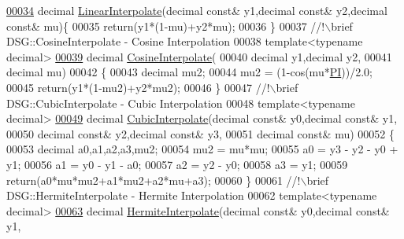 \begin{DoxyCode}
\hypertarget{_interpolate_8h_source_l00034}{}\hyperlink{namespace_d_s_g_af4448472776648fb65623fd29eed262f}{00034}     decimal \hyperlink{namespace_d_s_g_af4448472776648fb65623fd29eed262f}{LinearInterpolate}(decimal \textcolor{keyword}{const}& y1,decimal \textcolor{keyword}{const}& y2,decimal \textcolor{keyword}{const}& mu)\{
00035         \textcolor{keywordflow}{return}(y1*(1-mu)+y2*mu);
00036     \}\textcolor{comment}{}
00037 \textcolor{comment}{    //!\(\backslash\)brief DSG::CosineInterpolate - Cosine Interpolation}
00038 \textcolor{comment}{}    \textcolor{keyword}{template}<\textcolor{keyword}{typename} decimal>
\hypertarget{_interpolate_8h_source_l00039}{}\hyperlink{namespace_d_s_g_a293229b6a440ddf9cc87e9a76d322d43}{00039}     decimal \hyperlink{namespace_d_s_g_a293229b6a440ddf9cc87e9a76d322d43}{CosineInterpolate}(
00040                               decimal y1,decimal y2,
00041                               decimal mu)
00042     \{
00043         decimal mu2;
00044         mu2 = (1-cos(mu*\hyperlink{_p_i_8h_a598a3330b3c21701223ee0ca14316eca}{PI}))/2.0;
00045         \textcolor{keywordflow}{return}(y1*(1-mu2)+y2*mu2);
00046     \}\textcolor{comment}{}
00047 \textcolor{comment}{    //!\(\backslash\)brief DSG::CubicInterpolate - Cubic Interpolation}
00048 \textcolor{comment}{}    \textcolor{keyword}{template}<\textcolor{keyword}{typename} decimal>
\hypertarget{_interpolate_8h_source_l00049}{}\hyperlink{namespace_d_s_g_a7c61e97fb15300de270eb32d51cdc849}{00049}     decimal \hyperlink{namespace_d_s_g_a7c61e97fb15300de270eb32d51cdc849}{CubicInterpolate}(decimal \textcolor{keyword}{const}& y0,decimal \textcolor{keyword}{const}& y1,
00050                              decimal \textcolor{keyword}{const}& y2,decimal \textcolor{keyword}{const}& y3,
00051                              decimal \textcolor{keyword}{const}& mu)
00052     \{
00053         decimal a0,a1,a2,a3,mu2;
00054         mu2 = mu*mu;
00055         a0 = y3 - y2 - y0 + y1;
00056         a1 = y0 - y1 - a0;
00057         a2 = y2 - y0;
00058         a3 = y1;
00059         \textcolor{keywordflow}{return}(a0*mu*mu2+a1*mu2+a2*mu+a3);
00060     \}\textcolor{comment}{}
00061 \textcolor{comment}{    //!\(\backslash\)brief DSG::HermiteInterpolate - Hermite Interpolation}
00062 \textcolor{comment}{}    \textcolor{keyword}{template}<\textcolor{keyword}{typename} decimal>
\hypertarget{_interpolate_8h_source_l00063}{}\hyperlink{namespace_d_s_g_ae1b0502c523a1a123bdde9aa33ebbb77}{00063}     decimal \hyperlink{namespace_d_s_g_ae1b0502c523a1a123bdde9aa33ebbb77}{HermiteInterpolate}(decimal \textcolor{keyword}{const}& y0,decimal \textcolor{keyword}{const}& y1,

\end{DoxyCode}
